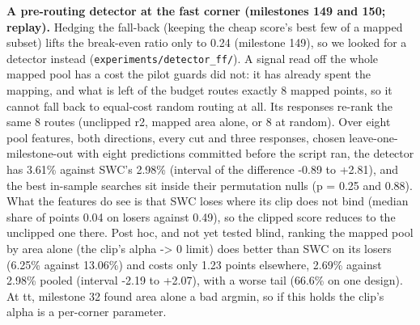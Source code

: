 \documentclass[conference]{IEEEtran}
\begin{document}
\textbf{A pre-routing detector at the fast corner (milestones 149 and
150; replay).} Hedging the fall-back (keeping the cheap score's best few
of a mapped subset) lifts the break-even ratio only to 0.24 (milestone
149), so we looked for a detector instead
(\texttt{experiments/\allowbreak{}detector\_\allowbreak{}ff/\allowbreak{}}). A signal read off the whole mapped
pool has a cost the pilot guards did not: it has already spent the
mapping, and what is left of the budget routes exactly 8 mapped points,
so it cannot fall back to equal-cost random routing at all. Its
responses re-rank the same 8 routes (unclipped r2, mapped area alone, or
8 at random). Over eight pool features, both directions, every cut and
three responses, chosen leave-one-milestone-out with eight predictions
committed before the script ran, the detector has 3.61\% against SWC's
2.98\% (interval of the difference -0.89 to +2.81), and the best
in-sample searches sit inside their permutation nulls (p = 0.25 and
0.88). What the features do see is that SWC loses where its clip does
not bind (median share of points 0.04 on losers against 0.49), so the
clipped score reduces to the unclipped one there. Post hoc, and not yet
tested blind, ranking the mapped pool by area alone (the clip's alpha
-\textgreater{} 0 limit) does better than SWC on its losers (6.25\%
against 13.06\%) and costs only 1.23 points elsewhere, 2.69\% against
2.98\% pooled (interval -2.19 to +2.07), with a worse tail (66.6\% on
one design). At tt, milestone 32 found area alone a bad argmin, so if
this holds the clip's alpha is a per-corner parameter.
\end{document}
